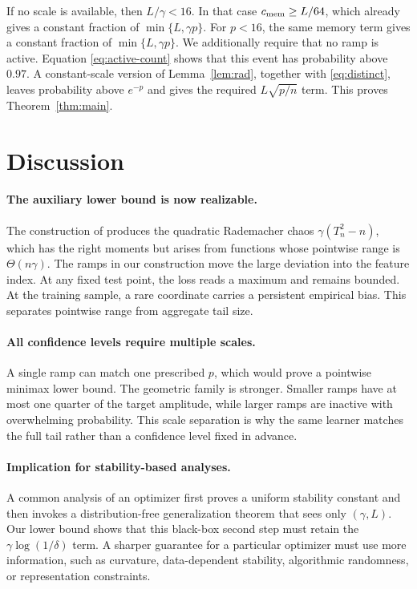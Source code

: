 \documentclass{article}
\newcommand{\1}{\mathbf 1}
\begin{document}
If no scale is available, then $L/\gamma<16$. In that case $c_{\rm mem}\ge L/64$, which already gives a constant fraction of $\min\{L,\gamma p\}$. For $p<16$, the same memory term gives a constant fraction of $\min\{L,\gamma p\}$. We additionally require that no ramp is active. Equation \eqref{eq:active-count} shows that this event has probability above $0.97$. A constant-scale version of Lemma~\ref{lem:rad}, together with \eqref{eq:distinct}, leaves probability above $e^{-p}$ and gives the required $L\sqrt{p/n}$ term. This proves Theorem~\ref{thm:main}.

\section{Discussion}\label{sec:discussion}

\paragraph{The auxiliary lower bound is now realizable.}
The construction of \citet{bousquet2020} produces the quadratic Rademacher chaos $\gamma(T_n^2-n)$, which has the right moments but arises from functions whose pointwise range is $\Theta(n\gamma)$. The ramps in our construction move the large deviation into the feature index. At any fixed test point, the loss reads a maximum and remains bounded. At the training sample, a rare coordinate carries a persistent empirical bias. This separates pointwise range from aggregate tail size.

\paragraph{All confidence levels require multiple scales.}
A single ramp can match one prescribed $p$, which would prove a pointwise minimax lower bound. The geometric family is stronger. Smaller ramps have at most one quarter of the target amplitude, while larger ramps are inactive with overwhelming probability. This scale separation is why the same learner matches the full tail rather than a confidence level fixed in advance.

\paragraph{Implication for stability-based analyses.}
A common analysis of an optimizer first proves a uniform stability constant and then invokes a distribution-free generalization theorem that sees only $(\gamma,L)$. Our lower bound shows that this black-box second step must retain the $\gamma\log(1/\delta)$ term. A sharper guarantee for a particular optimizer must use more information, such as curvature, data-dependent stability, algorithmic randomness, or representation constraints.
\end{document}
